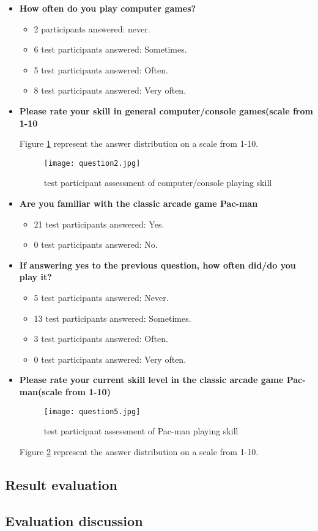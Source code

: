 \begin{itemize}
\item \textbf{How often do you play computer games?}
\begin{itemize}
\item 2 participants answered: never.
\item 6 test participants answered: Sometimes.
\item 5 test participants answered: Often.
\item 8 test participants answered: Very often.
\end{itemize}
\item \textbf{Please rate your skill in general computer/console games(scale from 1-10}

Figure \ref{fig:question2} represent the answer distribution on a scale from 1-10.

\begin{figure}[!htbp]
\centering
\texttt{[image: question2.jpg]}
\caption{test participant assessment of computer/console playing skill}
\label{fig:question2}
\end{figure}

\item \textbf{Are you familiar with the classic arcade game Pac-man}
\begin{itemize}
\item 21 test participants answered: Yes.
\item 0 test participants answered: No.
\end{itemize}
\item \textbf{If answering yes to the previous question, how often did/do you play it?}
\begin{itemize}
\item 5 test participants answered: Never.
\item 13 test participants answered: Sometimes.
\item 3 test participants answered: Often.
\item 0 test participants answered: Very often.
\end{itemize}
\item \textbf{Please rate your current skill level in the classic arcade game Pac-man(scale from 1-10)}

\begin{figure}[!htbp]
\centering
\texttt{[image: question5.jpg]}
\caption{test participant assessment of Pac-man playing skill}
\label{fig:question5}
\end{figure}

Figure \ref{fig:question5} represent the answer distribution on a scale from 1-10.


\end{itemize}

\subsection{Result evaluation} \label{resulteval}





\subsection{Evaluation discussion}